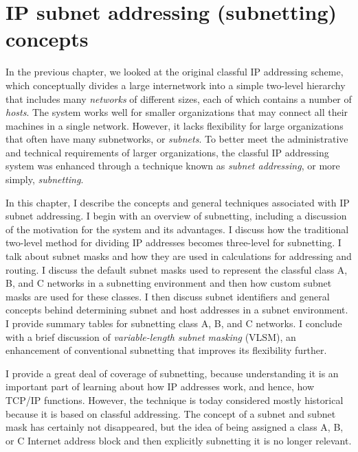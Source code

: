 \chapter{IP subnet addressing (subnetting) concepts}
\label{chap:kozierok-ch18}

In the previous chapter, we looked at the original classful IP
addressing scheme, which conceptually divides a large internetwork into
a simple two-level hierarchy that includes many \emph{networks} of
different sizes, each of which contains a number of \emph{hosts}.
The system works well for smaller organizations that may connect all their
machines in a single network. However, it lacks flexibility for large
organizations that often have many subnetworks, or {\emph{subnets}}. To
better meet the administrative and technical requirements of larger
organizations, the classful IP addressing system was enhanced through a
technique known as {\emph{subnet addressing}}, or more simply, \emph{subnetting}.

In this chapter, I describe the concepts and general techniques
associated with IP subnet addressing. I begin with an overview of
subnetting, including a discussion of the motivation for the system and
its advantages. I discuss how the traditional two-level method for
dividing IP addresses becomes three-level for subnetting. I talk about
subnet masks and how they are used in calculations for addressing and
routing. I discuss the default subnet masks used to represent the
classful class A, B, and C networks in a subnetting environment and then
how custom subnet masks are used for these classes.
I then discuss subnet identifiers and general concepts behind determining subnet and host addresses in a subnet environment.
I provide summary tables for subnetting class A, B, and C networks.
I conclude with a brief discussion of \emph{variable-length subnet masking} (VLSM), an enhancement of conventional subnetting that improves its flexibility further.

\begin{note}
I provide a great deal of coverage of subnetting, because
understanding it is an important part of learning about how IP addresses
work, and hence, how TCP/IP functions. However, the technique is today
considered mostly historical because it is based on classful
addressing. The concept of a subnet and subnet mask has certainly not
disappeared, but the idea of being assigned a class A, B, or C Internet
address block and then explicitly subnetting it is no longer relevant.
\end{note}



